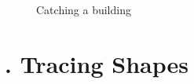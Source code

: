 \begin{appendices}
\begin{figure}
	\par \smallskip
	
	\caption{Catching a building}
	\label{fig:finalstudycatchingbuilding1}
\end{figure}


\chapter{. Tracing Shapes}
\label{app:finalstudy_tracingshapes}


\end{appendices}
